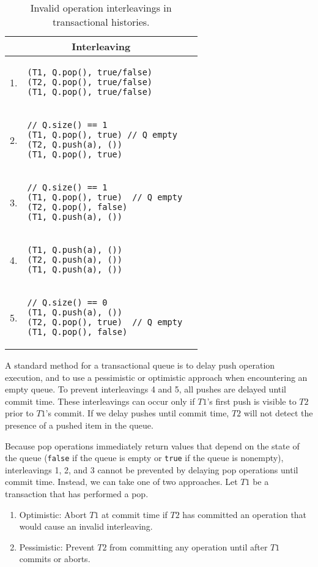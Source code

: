 \begin{table}
    \centering
    \begin{tabular}{|c|l|}
        \hline
\multicolumn{2}{|c|}{Interleaving}\\
        \hline
1. & 
\begin{lstlisting}
(T1, Q.pop(), true/false)  
(T2, Q.pop(), true/false)       
(T1, Q.pop(), true/false)
\end{lstlisting} 
       \\ 
    \hline
        2. & 
\begin{lstlisting}
// Q.size() == 1  
(T1, Q.pop(), true) // Q empty  
(T2, Q.push(a), ())
(T1, Q.pop(), true)
\end{lstlisting} 
       \\ 
    \hline
        3. & 
\begin{lstlisting}
// Q.size() == 1  
(T1, Q.pop(), true)  // Q empty  
(T2, Q.pop(), false)
(T1, Q.push(a), ())
\end{lstlisting} 
\\
\hline
        4. &
\begin{lstlisting}
(T1, Q.push(a), ()) 
(T2, Q.push(a), ())
(T1, Q.push(a), ())
\end{lstlisting} 
\\
\hline
        5. &
\begin{lstlisting}
// Q.size() == 0 
(T1, Q.push(a), ())       
(T2, Q.pop(), true)  // Q empty
(T1, Q.pop(), false) 
\end{lstlisting} 
\\
    \hline
\end{tabular}
    \caption{Invalid operation interleavings in transactional histories.}
    \label{tab:interleavings}
\end{table}

A standard method for a transactional queue is to delay push operation execution, and to use a pessimistic or optimistic approach when encountering an empty queue.
To prevent interleavings 4 and 5, all pushes are delayed until commit time. These interleavings can occur only if $T1$'s first push is visible to $T2$ prior to $T1$'s commit. If we delay pushes until commit time, $T2$ will not detect the presence of a pushed item in the queue.

Because pop operations immediately return values that depend on the state of the queue (\texttt{false} if the queue is empty or \texttt{true} if the queue is nonempty), interleavings 1, 2, and 3 cannot be prevented by delaying pop operations until commit time. Instead, we can take one of two approaches. Let $T1$ be a transaction that has performed a pop.
\begin{enumerate}
    \item Optimistic: Abort $T1$ at commit time if $T2$ has committed an operation that would cause an invalid interleaving.
    \item Pessimistic: Prevent $T2$ from committing any operation until after $T1$ commits or aborts.
\end{enumerate}

